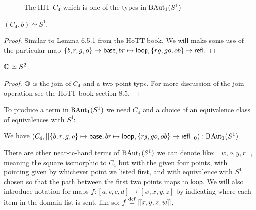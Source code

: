 \documentclass[12pt]{article}
\begin{document}
\begin{figure}[h]
\centering
{}
\caption{The HIT \( C_4 \) which is one of the types in \( \mathrm{BAut}_1(S^1) \)}
\end{figure}

\begin{mylemma}
\( (C_4, b)\simeq S^1 \).
\end{mylemma}
\begin{proof}Similar to Lemma 6.5.1 from the HoTT book\cite{hottbook}. We will make some use of the particular map \( \{b, r, g, o\}\mapsto \mathsf{base}, br\mapsto \mathsf{loop}, \{rg, go, ob\}\mapsto \mathsf{refl}. \)\end{proof}

\begin{mylemma}
\( \mathbb{O}\simeq S^2 \).
\end{mylemma}
\begin{proof}\( \mathbb{O} \) is the join of \( C_4 \) and a two-point type. For more discussion of the join operation see the HoTT book section 8.5\cite{hottbook}.\end{proof}

To produce a term in \( \mathrm{BAut}_1(S^1) \) we need \( C_4 \) and a choice of an equivalence class of equivalences with \( S^1 \):
\begin{mylemma}
We have \( (C_4, ||\{b, r, g, o\}\mapsto \mathsf{base}, br\mapsto \mathsf{loop}, \{rg, go, ob\}\mapsto \mathsf{refl} ||_0):\mathrm{BAut}_1(S^1) \)
\end{mylemma}

There are other near-to-hand terms of \( \mathrm{BAut}_1(S^1) \) we can denote like: \( [w, o, y, r] \), meaning the square isomorphic to \( C_4 \) but with the given four points, with pointing given by whichever point we listed first, and with equivalence with \( S^1 \) chosen so that the path between the first two points maps to \( \mathsf{loop} \). We will also introduce notation for maps \( f:[a, b, c, d]\to [w, x, y, z] \) by indicating where each item in the domain list is sent, like so: \( f\stackrel{\mathrm{def}}{=}[[x, y, z, w]] \).
\end{document}
